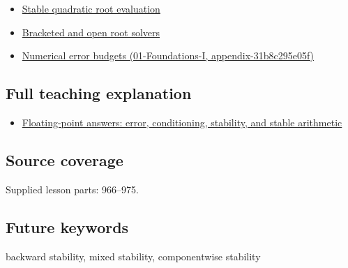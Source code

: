 \begin{itemize}
\tightlist
\item
  \hyperref[appendix-b9afba7f63e5]{Stable quadratic root evaluation}
\item
  \hyperref[appendix-f63eb850796d]{Bracketed and open root solvers}
\item
  \href{../01-Foundations-I/main.pdf\#nameddest=appendix-31b8c295e05f}{Numerical error budgets (01-Foundations-I, appendix-31b8c295e05f)}
\end{itemize}

\subsection{Full teaching explanation}\label{appendix-aa2bf0d79639-full-teaching-explanation}

\begin{itemize}
\tightlist
\item
  \hyperref[02-foundations-ii-ch028-floating-point-answers-error-conditioning-stability-and-stable-arithmetic]{Floating-point answers: error, conditioning, stability, and stable arithmetic}
\end{itemize}

\subsection{Source coverage}\label{appendix-aa2bf0d79639-source-coverage}

Supplied lesson parts: 966--975.

\subsection{Future keywords}\label{appendix-aa2bf0d79639-future-keywords}

backward stability, mixed stability, componentwise stability
